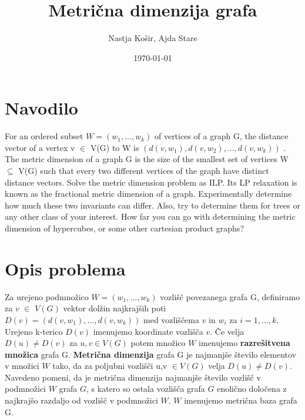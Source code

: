 \documentclass[a4paper]{report}
\title{Metrična dimenzija grafa }
\author{Nastja Košir, Ajda Stare}
\date{\today}
\begin{document}
	\maketitle

\section{Navodilo}
For an ordered subset $W = (w_1 , \dots, w_k ) $ of vertices of a graph G, the distance vector of a vertex v $\in$ V(G)  to  W  is  $(d(v, w_1 ), d(v, w_2 ), \dots, d(v, w_k ))$ . The metric dimension of a graph G is the size of the smallest set of vertices W  $\subseteq $ V(G) such that every two different vertices of the graph have distinct distance vectors. Solve the metric dimension problem as ILP. Its LP relaxation is known as the fractional metric dimension of a graph. Experimentally determine how much these two invariants can differ. Also, try to determine them for trees or any other class of your interest. How far you can go with determining the metric dimension of hypercubes, or some other cartesian product graphs?\\

\section{Opis problema}
Za urejeno podmnožico $ W =(w_1 , \dots, w_k )$ vozlišč povezanega grafa G, definiramo za $v$ $\in$ $V(G)$ vektor dolžin najkrajših poti {\small $D(v)=(d(v,w_1),...,d(v,w_k))$} med vozliščema $v$ in $w_i$ za $i = 1,\dots, k $. Urejeno k-terico $D(v)$ imenujemo koordinate vozlišča $v$. Če velja $D(u) \neq D(v)$ za $u,v \in V(G)$  potem množico $W$ imenujemo \textbf{razrešitvena množica} grafa G. \textbf{Metrična dimenzija} grafa G je najmanjše število elementov v množici $W$ tako, da za poljubni vozlišči u,v $\in V(G)$ velja $D(u) \neq D(v)$. Navedeno pomeni, da je metrična dimenzija najmanjše število vozlišč v podmnožici $W$ grafa $G$, s katero so ostala vozlišča grafa $G$ enolično določena z najkrajšo razdaljo od vozlišč v podmnožici $W$. $W$ imenujemo metrična baza grafa G. \\
\end{document}
